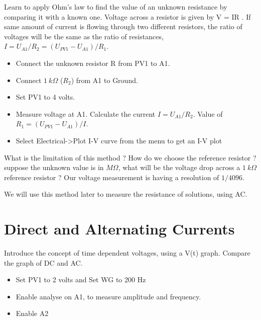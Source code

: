\documentclass[a4paper,12pt,english]{sphinxmanual}
\let\sphinxpxdimen\pdfpxdimen\else\newdimen\sphinxpxdimen
\begin{document}
Learn to apply Ohm’s law to find the value of an unknown resistance by
comparing it with a known one. Voltage across a resistor is given by
V = IR . If same amount of current is flowing through two different
resistors, the ratio of voltages will be the same as the ratio of
resistances, \(I = U_{A1}/R_2 = (U_{PV1} - U_{A1})/R_1\).

\noindent\sphinxincludegraphics[width=300\sphinxpxdimen]{{res-compare}.pdf}

\begin{itemize}
\item {} 
Connect the unknown resistor R from PV1 to A1.

\item {} 
Connect \(1~k\Omega\) (\(R_2\)) from A1 to Ground.

\item {} 
Set PV1 to 4 volts.

\item {} 
Measure voltage at A1. Calculate the current \(I = U_{A1}/R_2\).
Value of \(R_1 = (U_{PV1} - U_{A1})/I\).

\item {} 
Select Electrical-\textgreater{}Plot I-V curve from the menu to get an I-V plot

\end{itemize}


What is the limitation of this method ? How do we choose the reference
resistor ? suppose the unknown value is in \(M\Omega\), what will be the
voltage drop across a \(1~k\Omega\) reference resistor ? Our voltage
measurement is having a resolution of \(1/4096\).

We will use this method later to measure the resistance of solutions,
using AC.


\section{Direct and Alternating Currents}
\label{\detokenize{2.5:direct-and-alternating-currents}}\label{\detokenize{2.5::doc}}

Introduce the concept of time dependent voltages, using a V(t) graph.
Compare the graph of DC and AC.

\noindent\sphinxincludegraphics[width=300\sphinxpxdimen]{{ac-dc}.pdf}

\begin{itemize}
\item {} 
Set PV1 to 2 volts and Set WG to 200 Hz

\item {} 
Enable analyse on A1, to measure amplitude and frequency.

\item {} 
Enable A2

\end{itemize}
\end{document}
